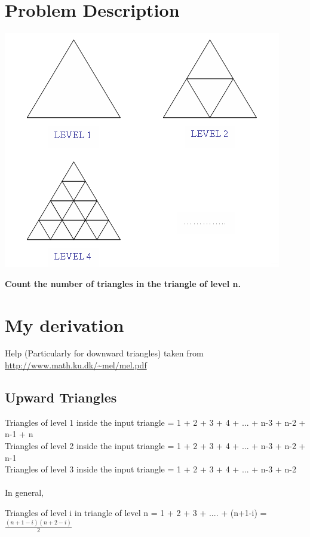 \documentclass[12pt]{article}
\begin{document}
 \section{\Huge \color{red} Problem Description}
 
 \includegraphics{diag}
 
 \textbf{Count the number of triangles in the triangle of level n.}
 
 \section{\Huge \color{red} My derivation}
 
 Help (Particularly for downward triangles) taken from \url{http://www.math.ku.dk/~mel/mel.pdf}
 
 \subsection{\color{blue}Upward Triangles}
 
 Triangles of level 1 inside the input triangle = 1 + 2 + 3 + 4 + ... + n-3 + n-2 + n-1 + n\\
 Triangles of level 2 inside the input triangle = 1 + 2 + 3 + 4 + ... + n-3 + n-2 + n-1\\
 Triangles of level 3 inside the input triangle = 1 + 2 + 3 + 4 + ... + n-3 + n-2
 \\ \\
 In general,
 
 Triangles of level i in triangle of level n = 1 + 2 + 3 + .... + (n+1-i) = $\displaystyle\frac{(n+1-i)(n+2-i)}{2}$
 
\end{document}
